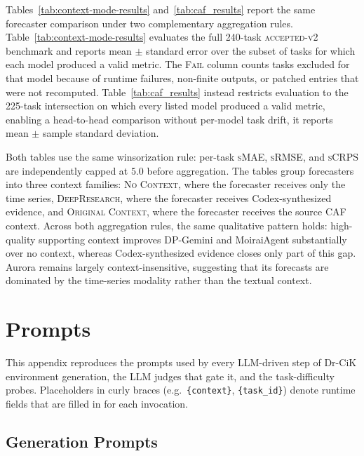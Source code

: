 \documentclass[]{servicenow}
\begin{document}
Tables~\ref{tab:context-mode-results} and~\ref{tab:caf_results} report the same forecaster comparison under two complementary aggregation rules.
Table~\ref{tab:context-mode-results} evaluates the full 240-task \textsc{accepted-v2} benchmark and reports mean $\pm$ standard error over the subset of tasks for which each model produced a valid metric. The \textsc{Fail} column counts tasks excluded for that model because of runtime failures, non-finite outputs, or patched entries that were not recomputed.
Table~\ref{tab:caf_results} instead restricts evaluation to the 225-task intersection on which every listed model produced a valid metric, enabling a head-to-head comparison without per-model task drift, it reports mean $\pm$ sample standard deviation.

Both tables use the same winsorization rule: per-task \textsc{sMAE}, \textsc{sRMSE}, and \textsc{sCRPS} are independently capped at $5.0$ before aggregation.
The tables group forecasters into three context families: \textsc{No Context}, where the forecaster receives only the time series, \textsc{DeepResearch}, where the forecaster receives Codex-synthesized evidence, and \textsc{Original Context}, where the forecaster receives the source CAF context.
Across both aggregation rules, the same qualitative pattern holds: high-quality supporting context improves DP-Gemini and MoiraiAgent substantially over no context, whereas Codex-synthesized evidence closes only part of this gap. Aurora remains largely context-insensitive, suggesting that its forecasts are dominated by the time-series modality rather than the textual context.

\clearpage

\section{Prompts}
\label{appendix:prompts}

This appendix reproduces the prompts used by every LLM-driven step of
Dr-CiK environment generation, the LLM judges that gate it, and the
task-difficulty probes. Placeholders in curly braces (e.g.\
\texttt{\{context\}}, \texttt{\{task\_id\}}) denote runtime fields that are filled in for each invocation.

\subsection{Generation Prompts}
\label{app:prompts-generation}
\end{document}
